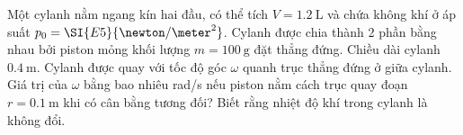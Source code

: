 \begin{ex}
	Một cylanh nằm ngang kín hai đầu, có thể tích $V=\SI{1.2}{\liter}$ và chứa không khí ở áp suất $p_0=\SI{E5}{\newton/\meter^2}$. Cylanh được chia thành 2 phần bằng nhau bởi piston mỏng khối lượng $m=\SI{100}{\gram}$ đặt thẳng đứng. Chiều dài cylanh $\SI{0.4}{\meter}$. Cylanh được quay với tốc độ góc $\omega$ quanh trục thẳng đứng ở giữa cylanh. Giá trị của $\omega$ bằng bao nhiêu \si{\radian/\second} nếu piston nằm cách trục quay đoạn $r=\SI{0.1}{\meter}$ khi có cân bằng tương đối? Biết rằng nhiệt độ khí trong cylanh là không đổi.
\end{ex}
